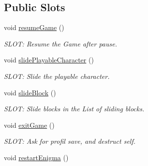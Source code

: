 \subsection*{Public Slots}
\begin{DoxyCompactItemize}
\item 
\hypertarget{class_g___gameboard_a1e25a7b0f6613e95a1f511456da194be}{}void \hyperlink{class_g___gameboard_a1e25a7b0f6613e95a1f511456da194be}{resume\+Game} ()\label{class_g___gameboard_a1e25a7b0f6613e95a1f511456da194be}

\begin{DoxyCompactList}\small\item\em S\+L\+O\+T\+: Resume the Game after pause. \end{DoxyCompactList}\item 
\hypertarget{class_g___gameboard_abf8df9d44eaa471ad102887ec901ab78}{}void \hyperlink{class_g___gameboard_abf8df9d44eaa471ad102887ec901ab78}{slide\+Playable\+Character} ()\label{class_g___gameboard_abf8df9d44eaa471ad102887ec901ab78}

\begin{DoxyCompactList}\small\item\em S\+L\+O\+T\+: Slide the playable character. \end{DoxyCompactList}\item 
\hypertarget{class_g___gameboard_acfa547e03c2451bda2b28cc1d9a7ed2d}{}void \hyperlink{class_g___gameboard_acfa547e03c2451bda2b28cc1d9a7ed2d}{slide\+Block} ()\label{class_g___gameboard_acfa547e03c2451bda2b28cc1d9a7ed2d}

\begin{DoxyCompactList}\small\item\em S\+L\+O\+T\+: Slide blocks in the List of sliding blocks. \end{DoxyCompactList}\item 
\hypertarget{class_g___gameboard_aed56d94cf1c9bac8790b3405f8cdb76d}{}void \hyperlink{class_g___gameboard_aed56d94cf1c9bac8790b3405f8cdb76d}{exit\+Game} ()\label{class_g___gameboard_aed56d94cf1c9bac8790b3405f8cdb76d}

\begin{DoxyCompactList}\small\item\em S\+L\+O\+T\+: Ask for profil save, and destruct self. \end{DoxyCompactList}\item 
\hypertarget{class_g___gameboard_ad0b089132d43872c36b24e06baf44993}{}void \hyperlink{class_g___gameboard_ad0b089132d43872c36b24e06baf44993}{restart\+Enigma} ()\label{class_g___gameboard_ad0b089132d43872c36b24e06baf44993}


\end{DoxyCompactItemize}
